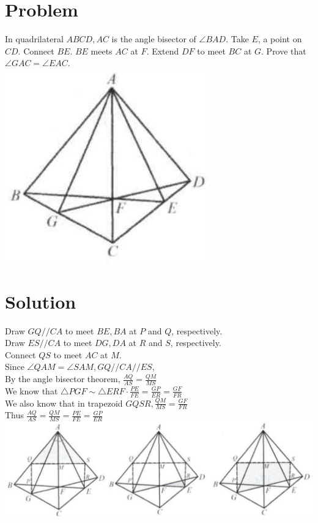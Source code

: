\documentclass{article}
\begin{document}
\section*{Problem}
In quadrilateral \(A B C D, A C\) is the angle bisector of \(\angle B A D\). Take \(E\), a point on \(C D\). Connect \(B E\). \(B E\) meets \(A C\) at \(F\). Extend \(D F\) to meet \(B C\) at \(G\). Prove that \(\angle G A C=\angle E A C\).\\
\centering
\includegraphics[width=\textwidth]{images/130.jpg}

\section*{Solution}
Draw \(G Q / / C A\) to meet \(B E, B A\) at \(P\) and \(Q\), respectively.\\
Draw \(E S / / C A\) to meet \(D G, D A\) at \(R\) and \(S\), respectively.\\
Connect \(Q S\) to meet \(A C\) at \(M\).\\
Since \(\angle Q A M=\angle S A M, G Q / / C A / / E S\),\\
By the angle bisector theorem, \(\frac{A Q}{A S}=\frac{Q M}{M S}\)\\
We know that \(\triangle P G F \sim \triangle E R F \cdot \frac{P E}{F E}=\frac{G P}{E R}=\frac{G F}{F R}\)\\
We also know that in trapezoid \(G Q S R, \frac{Q M}{M S}=\frac{G F}{F R}\)\\
Thus \(\frac{A Q}{A S}=\frac{Q M}{M S}=\frac{P E}{F E}=\frac{G P}{E R}\)\\
\centering
\includegraphics[width=\textwidth]{images/143.jpg}
\end{document}
